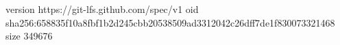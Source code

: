 version https://git-lfs.github.com/spec/v1
oid sha256:658835f10a8fbf1b2d245cbb20538509ad3312042c26dff7de1f830073321468
size 349676
